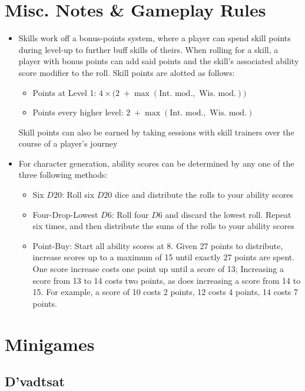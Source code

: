 \documentclass[12pt, landscape]{article}
\begin{document}
\begin{FlushLeft}
\begin{multicols}{2}
			\section{Misc. Notes \& Gameplay Rules}
			\begin{itemize}
				\item Skills work off a bonus-points system, where a player can spend skill points during level-up to further buff skills of theirs. When rolling for a skill, a player with bonus points can add said points and the skill's associated ability score modifier to the roll. Skill points are alotted as follows:
				\begin{itemize}
					\item Points at Level 1: \linebreak $4 \times \big(2 \; + \max(\text{Int. mod.}, \text{ Wis. mod.})\big)$
					\item Points every higher level: \linebreak $2 \; + \max(\text{Int. mod.}, \text{ Wis. mod.})$
				\end{itemize}
				Skill points can also be earned by taking sessions with skill trainers over the course of a player's journey
				\item For character generation, ability scores can be determined by any one of the three following methods:
				\begin{itemize}
					\item Six $D20$: Roll six $D20$ dice and distribute the rolls to your ability scores
					\item Four-Drop-Lowest $D6$: Roll four $D6$ and discard the lowest roll. Repeat six times, and then distribute the sums of the rolls to your ability scores
					\item Point-Buy: Start all ability scores at 8. Given 27 points to distribute, increase scores up to a maximum of 15 until exactly 27 points are spent. One score increase costs one point up until a score of 13; Increasing a score from 13 to 14 costs two points, as does increasing a score from 14 to 15. For example, a score of 10 costs 2 points, 12 costs 4 points, 14 costs 7 points.
				\end{itemize}
			\end{itemize}
			\vfill \pagebreak

			\section{Minigames}

			\subsection{D'vadtsat}


\end{multicols}
\end{FlushLeft}
\end{document}
